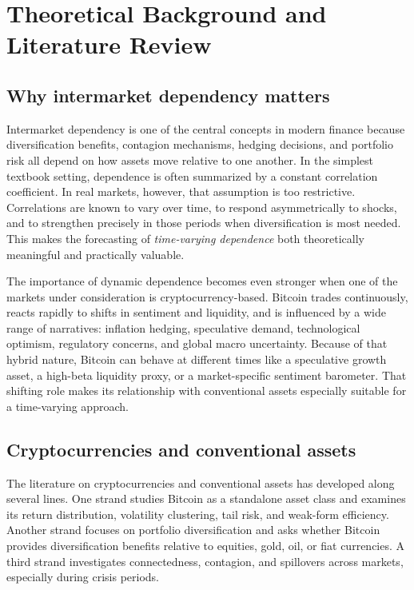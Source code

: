 ﻿\section{Theoretical Background and Literature Review}

\subsection{Why intermarket dependency matters}

Intermarket dependency is one of the central concepts in modern finance because diversification benefits, contagion mechanisms, hedging decisions, and portfolio risk all depend on how assets move relative to one another. In the simplest textbook setting, dependence is often summarized by a constant correlation coefficient. In real markets, however, that assumption is too restrictive. Correlations are known to vary over time, to respond asymmetrically to shocks, and to strengthen precisely in those periods when diversification is most needed. This makes the forecasting of \emph{time-varying dependence} both theoretically meaningful and practically valuable.

The importance of dynamic dependence becomes even stronger when one of the markets under consideration is cryptocurrency-based. Bitcoin trades continuously, reacts rapidly to shifts in sentiment and liquidity, and is influenced by a wide range of narratives: inflation hedging, speculative demand, technological optimism, regulatory concerns, and global macro uncertainty. Because of that hybrid nature, Bitcoin can behave at different times like a speculative growth asset, a high-beta liquidity proxy, or a market-specific sentiment barometer. That shifting role makes its relationship with conventional assets especially suitable for a time-varying approach.

\subsection{Cryptocurrencies and conventional assets}

The literature on cryptocurrencies and conventional assets has developed along several lines. One strand studies Bitcoin as a standalone asset class and examines its return distribution, volatility clustering, tail risk, and weak-form efficiency. Another strand focuses on portfolio diversification and asks whether Bitcoin provides diversification benefits relative to equities, gold, oil, or fiat currencies. A third strand investigates connectedness, contagion, and spillovers across markets, especially during crisis periods.

